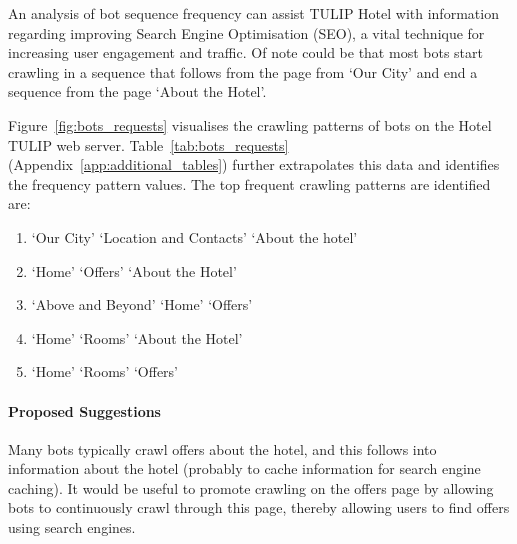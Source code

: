 An analysis of bot sequence frequency can assist TULIP Hotel with information regarding improving Search Engine Optimisation (SEO), a vital technique for increasing user engagement and traffic. Of note could be that most bots start crawling in a sequence that follows from the page from `Our City' and end a sequence from the page `About the Hotel'. 

Figure~\ref{fig:bots_requests} visualises the crawling patterns of bots on the Hotel TULIP web server. Table~\ref{tab:bots_requests}  (Appendix~\ref{app:additional_tables}) further extrapolates this data and identifies the frequency pattern values. The top frequent crawling patterns are identified are:

\begin{enumerate}
  \item `Our City' \ra{} `Location and Contacts' \ra{} `About the hotel'
  \item `Home' \ra{} `Offers' \ra{} `About the Hotel'
  \item `Above and Beyond' \ra{} `Home' \ra{} `Offers'
  \item `Home' \ra{} `Rooms' \ra{} `About the Hotel'
  \item `Home' \ra{} `Rooms' \ra{} `Offers'
\end{enumerate}

\paragraph{Proposed Suggestions} Many bots typically crawl offers about the hotel, and this follows into information about the hotel (probably to cache information for search engine caching). It would be useful to promote crawling on the offers page by allowing bots to continuously crawl through this page, thereby allowing users to find offers using search engines.

